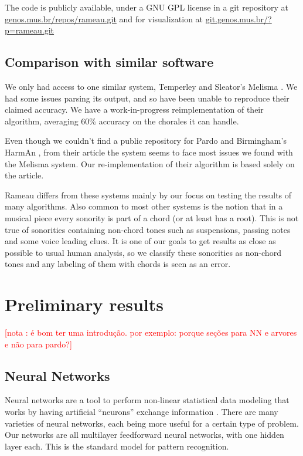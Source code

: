 \documentclass{article}
\newcounter{notacounter}
\newcommand{\nota}[1]{
  \addtocounter{notacounter}{1}
  \textcolor{red}{[nota \arabic{notacounter}: #1]}
}
\begin{document}
The code is publicly available, under a GNU GPL \cite{fsf:gpl} license
in a git \cite{baudis:_git_users_manual} repository at
\url{genos.mus.br/repos/rameau.git} and for visualization at
\url{git.genos.mus.br/?p=rameau.git}

\subsection{Comparison with similar software}
\label{sec:differences-from-similar-software}

We only had access to one similar system, Temperley and Sleator's
Melisma \cite{temperley99:modeling}. We had some issues parsing its
output, and so have been unable to reproduce their claimed
accuracy. We have a work-in-progress reimplementation of their
algorithm, averaging 60\% accuracy on the chorales it can handle.

Even though we couldn't find a public repository for Pardo and
Birmingham's HarmAn \cite{pardo99:automated}, from their article the
system seems to face most issues we found with the Melisma system. Our
re-implementation of their algorithm is based solely on the article.

Rameau differs from these systems mainly by our focus on testing the
results of many algorithms. Also common to most other systems is the
notion that in a musical piece every sonority is part of a chord (or
at least has a root). This is not true of sonorities containing
non-chord tones such as suspensions, passing notes and some voice
leading clues. It is one of our goals to get results as close as
possible to usual human analysis, so we classify these sonorities as
non-chord tones and any labeling of them with chords is seen as an
error.

\section{Preliminary results}
\label{sec:analysis-results}

\nota{é bom ter uma introdução. por exemplo: porque seções para NN e
  arvores e não para pardo?}

\subsection{Neural Networks}
\label{sec:neural-nets}

Neural networks are a tool to perform non-linear statistical data
modeling that works by having artificial ``neurons'' exchange
information \cite{russell02:aima}. There are
many varieties of neural networks, each being more useful for a
certain type of problem. Our networks are all multilayer feedforward
neural networks, with one hidden layer each. This is the standard
model for pattern recognition.
\end{document}
